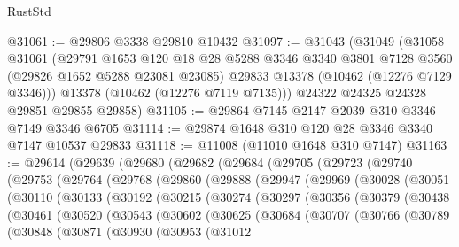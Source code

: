\begin{lexlean}{RustStd}
\begin{coremodule}
@31061 := @29806 @3338 @29810 @10432
@31097 := @31043
    (@31049
      (@31058
        @31061
        (@29791
          @1653
          @120
          @18
          @28
          @5288
          @3346
          @3340
          @3801
          @7128
          @3560
          (@29826 @1652 @5288 @23081 @23085)
          @29833
          @13378
          (@10462 (@12276 @7129 @3346)))
        @13378
        (@10462 (@12276 @7119 @7135)))
      @24322
      @24325
      @24328
      @29851
      @29855
      @29858)
@31105 := @29864 @7145 @2147 @2039 @310 @3346 @7149 @3346 @6705
@31114 := @29874 @1648 @310 @120 @28 @3346 @3340 @7147 @10537 @29833
@31118 := @11008 (@11010 @1648 @310 @7147)
@31163 := @29614
    (@29639
      (@29680
        (@29682
          (@29684
            (@29705
              (@29723
                (@29740
                  (@29753
                    (@29764
                      (@29768
                        (@29860
                          (@29888
                            (@29947
                              (@29969
                                (@30028
                                  (@30051
                                    (@30110
                                      (@30133
                                        (@30192
                                          (@30215
                                            (@30274
                                              (@30297
                                                (@30356
                                                  (@30379
                                                    (@30438
                                                      (@30461
                                                        (@30520
                                                          (@30543
                                                            (@30602
                                                              (@30625
                                                                (@30684
                                                                  (@30707
                                                                    (@30766
                                                                      (@30789
                                                                        (@30848
                                                                          (@30871
                                                                            (@30930
                                                                              (@30953
                                                                                (@31012

\end{coremodule}
\end{lexlean}
